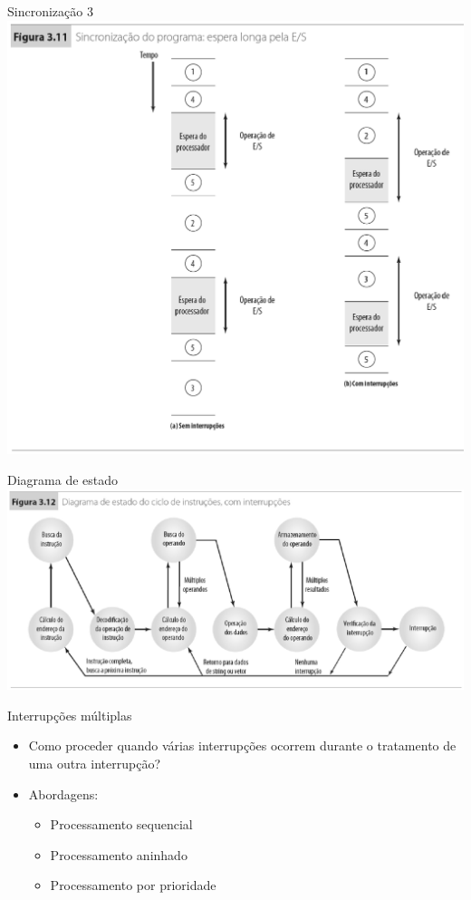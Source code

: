 \begin{slide}{Sincronização 3}
   \includegraphics[height=0.8\textheight]{figs/sinc2.eps}
\end{slide}

\begin{slide}{Diagrama de estado}
   \centering
   \includegraphics[width=\textwidth]{figs/int_estado.eps}
\end{slide}

\begin{slide}{Interrupções múltiplas}
\begin{itemize}
   \item Como proceder quando várias interrupções ocorrem durante o tratamento de uma outra interrupção?
   \item Abordagens:
   \begin{itemize}
      \item Processamento sequencial
      \item Processamento aninhado
      \item Processamento por prioridade
   \end{itemize}
\end{itemize}
\end{slide}

